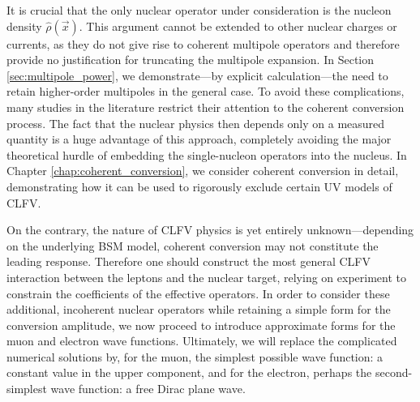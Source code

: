 \documentclass{book}[letterpaper,12pt]
\begin{document}
It is crucial that the only nuclear operator under consideration is the nucleon density $\hat{\rho}(\vec{x})$. This argument cannot be extended to other nuclear charges or currents, as they do not give rise to coherent multipole operators and therefore provide no justification for truncating the multipole expansion. In Section \ref{sec:multipole_power}, we demonstrate---by explicit calculation---the need to retain higher-order multipoles in the general case. To avoid these complications, many studies in the literature restrict their attention to the coherent conversion process. The fact that the nuclear physics then depends only on a measured quantity is a huge advantage of this approach, completely avoiding the major theoretical hurdle of embedding the single-nucleon operators into the nucleus. In Chapter \ref{chap:coherent_conversion}, we consider coherent conversion in detail, demonstrating how it can be used to rigorously exclude certain UV models of CLFV.

On the contrary, the nature of CLFV physics is yet entirely unknown---depending on the underlying BSM model, coherent conversion may not constitute the leading response. Therefore one should construct the most general CLFV interaction between the leptons and the nuclear target, relying on experiment to constrain the coefficients of the effective operators. In order to consider these additional, incoherent nuclear operators while retaining a simple form for the conversion amplitude, we now proceed to introduce approximate forms for the muon and electron wave functions. Ultimately, we will replace the complicated numerical solutions by, for the muon, the simplest possible wave function: a constant value in the upper component, and for the electron, perhaps the second-simplest wave function: a free Dirac plane wave.
 

\end{document}
